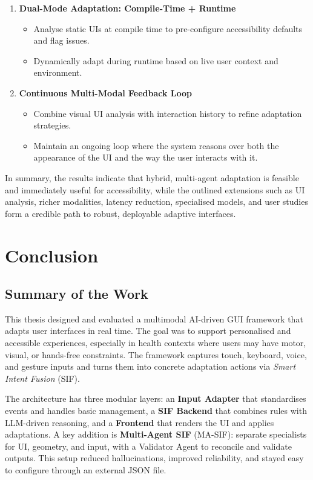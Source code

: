\documentclass[openany]{book}
\begin{document}
\begin{enumerate}
\begin{itemize}
        \end{itemize}
    \item \textbf{Dual-Mode Adaptation: Compile-Time + Runtime}
        \begin{itemize}
            \item Analyse static UIs at compile time to pre-configure accessibility defaults and flag issues.
            \item Dynamically adapt during runtime based on live user context and environment.
        \end{itemize}
    \item \textbf{Continuous Multi-Modal Feedback Loop}
        \begin{itemize}
            \item Combine visual UI analysis with interaction history to refine adaptation strategies.
            \item Maintain an ongoing loop where the system reasons over both the appearance of the UI and the way the user interacts with it.
        \end{itemize}
\end{enumerate}

\medskip
In summary, the results indicate that hybrid, multi-agent adaptation is feasible and immediately useful for accessibility, while the outlined extensions such as UI analysis, richer modalities, latency reduction, specialised models, and user studies form a credible path to robust, deployable adaptive interfaces.

\chapter{Conclusion}

\section{Summary of the Work}
This thesis designed and evaluated a multimodal AI-driven GUI framework that adapts user interfaces in real time. The goal was to support personalised and accessible experiences, especially in health contexts where users may have motor, visual, or hands-free constraints. The framework captures touch, keyboard, voice, and gesture inputs and turns them into concrete adaptation actions via \emph{Smart Intent Fusion} (SIF).

The architecture has three modular layers: an \textbf{Input Adapter} that standardises events and handles basic management, a \textbf{SIF Backend} that combines rules with LLM-driven reasoning, and a \textbf{Frontend} that renders the UI and applies adaptations. A key addition is \textbf{Multi-Agent SIF} (MA-SIF): separate specialists for UI, geometry, and input, with a Validator Agent to reconcile and validate outputs. This setup reduced hallucinations, improved reliability, and stayed easy to configure through an external JSON file.
\end{document}
